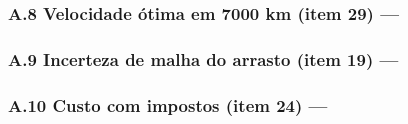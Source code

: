 \subsubsection*{A.8 Velocidade ótima em 7000 km (item 29) — }

\subsubsection*{A.9 Incerteza de malha do arrasto (item 19) — }

\subsubsection*{A.10 Custo com impostos (item 24) — }

